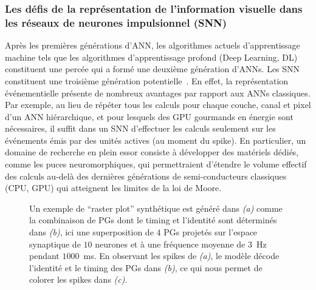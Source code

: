 \subsubsection{Les défis de la représentation de l'information visuelle
dans les réseaux de neurones impulsionnel
(SNN)}
Après les premières générations d'ANN, les algorithmes actuels
d'apprentissage machine tels que les algorithmes d'apprentissage profond
(Deep Learning, DL) constituent une percée qui a formé une deuxième génération d'ANNs.
Les SNN constituent une troisième génération potentielle~\citep{Ghosh09}. En effet, la représentation événementielle présente de
nombreux avantages par rapport aux ANNs classiques. Par exemple, au lieu de
répéter tous les calculs ­pour chaque couche, canal et pixel d'un ANN
hiérarchique, et pour lesquels des GPU gourmands en énergie sont
nécessaires, il suffit dans un SNN d'effectuer les calculs seulement sur les événements
émis par des unités actives (au moment du spike). En particulier, un domaine de
recherche en plein essor consiste à développer des matériels dédiés,
comme les puces neuromorphiques, qui permettraient d'étendre le volume
effectif des calculs au-delà des dernières générations de
semi-conducteurs classiques (CPU, GPU) qui atteignent les limites de la
loi de Moore.


\begin{figure}%
\caption{
Un exemple de ``raster plot'' synthétique est généré dans {\it (a)} comme la combinaison de PGs dont le timing et l'identité sont déterminés dans {\it (b)}, ici une superposition de $4$ PGs projetés sur l'espace synaptique de $10$ neurones et à une fréquence moyenne de $3$~Hz pendant $1000$~ms. En observant les spikes de {\it (a)}, le modèle décode l'identité et le timing des PGs dans {\it (b)}, ce qui nous permet de colorer les spikes dans {\it (c)}. %
}
\label{fig:Grimaldi22}
\end{figure}

